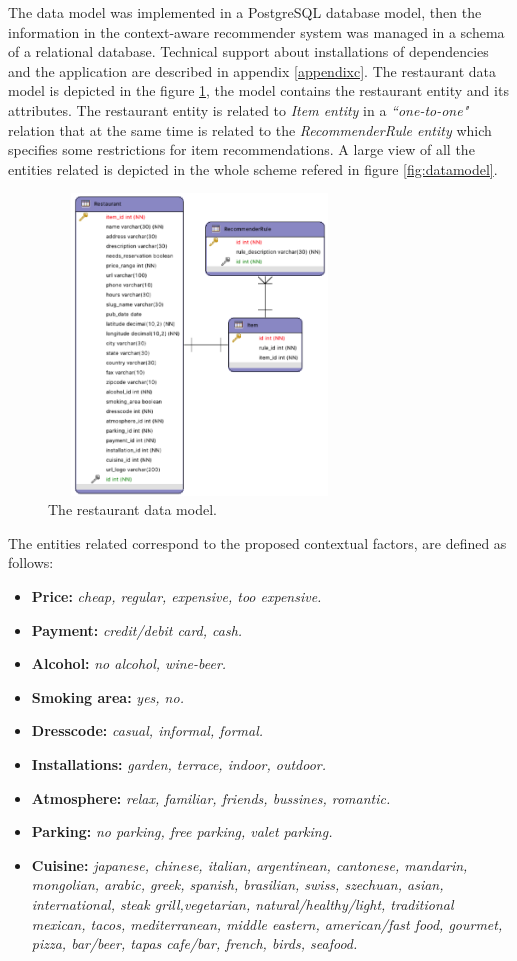 The data model was implemented in a PostgreSQL database model, 
then the information in the context-aware recommender system was
managed in a schema of a relational database. Technical support 
about installations of dependencies and the application are 
described in appendix \ref{appendixc}.
The restaurant data model is depicted in the figure
\ref{fig:restaurantmodeldata}, the model contains the restaurant
entity and its attributes. The restaurant entity is related to
\textit{Item entity} in a \textit{``one-to-one"} relation that at the
same time is related to the \textit{RecommenderRule entity} which
specifies some restrictions for item recommendations. A large view of
all the entities related is depicted in the whole scheme refered in
figure \ref{fig:datamodel}.
\begin{figure}
\captionsetup{justification=centering,margin=2cm,font=footnotesize}
\centering
\includegraphics[width=8cm,height=8cm,keepaspectratio]{img/data-resmodel.png}
\caption{The restaurant data model.}
\label{fig:restaurantmodeldata}     
\end{figure}
The entities related correspond to the proposed contextual factors, 
are defined as follows: 
\begin{itemize}
\item \textbf{Price:} \textit{cheap, regular, expensive, too expensive.}
\item \textbf{Payment:} \textit{credit/debit card, cash.}
\item \textbf{Alcohol:} \textit{no alcohol, wine-beer.}
\item \textbf{Smoking area:} \textit{yes, no.}
\item \textbf{Dresscode:} \textit{casual, informal, formal.}
\item \textbf{Installations:} \textit{garden, terrace, indoor, outdoor.}
\item \textbf{Atmosphere:} \textit{relax, familiar, friends, bussines, romantic.}
\item \textbf{Parking:} \textit{no parking, free parking, valet parking.}
\item \textbf{Cuisine:} \textit{japanese, chinese, italian, argentinean,
cantonese, mandarin, mongolian, arabic, greek, spanish, brasilian,
swiss, szechuan, asian, international, steak grill,vegetarian,
natural/healthy/light, traditional mexican, tacos, mediterranean,
middle eastern, american/fast food, gourmet, pizza, bar/beer, tapas
cafe/bar, french, birds, seafood.}
\end{itemize}
